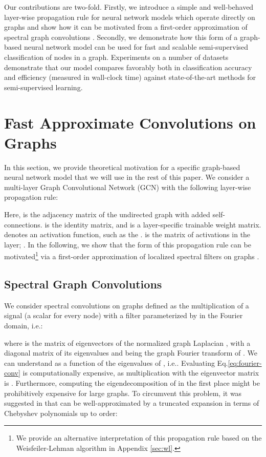 \documentclass{article} \usepackage{iclr2017_conference,times}
\makeatletter
\newcommand*{\ie}{i.e.\@\xspace}
\newcommand*{\eq}{Eq.\@\xspace}
\makeatother
\begin{document}
Our contributions are two-fold. Firstly, we introduce a simple and well-behaved layer-wise propagation rule for neural network models which operate directly on graphs and show how it can be motivated from a first-order approximation of spectral graph convolutions \citep{hammond2011wavelets}. Secondly, we demonstrate how this form of a graph-based neural network model can be used for fast and scalable semi-supervised classification of nodes in a graph. Experiments on a number of datasets demonstrate that our model compares favorably both in classification accuracy and efficiency (measured in wall-clock time) against state-of-the-art methods for semi-supervised learning.

\section{Fast Approximate Convolutions on Graphs}
\label{sec:fast-convs}

In this section, we provide theoretical motivation for a specific graph-based neural network model  that we will use in the rest of this paper. We consider a multi-layer Graph Convolutional Network (GCN) with the following layer-wise propagation rule:

Here,  is the adjacency matrix of the undirected graph  with added self-connections.   is the identity matrix,  and  is a layer-specific trainable weight matrix.  denotes an activation function, such as the .  is the matrix of activations in the  layer; . In the following, we show that the form of this propagation rule can be motivated\footnote{We provide an alternative interpretation of this propagation rule based on the Weisfeiler-Lehman algorithm \citep{weisfeiler1968reduction} in Appendix \ref{sec:wl}.} via a first-order approximation of localized spectral filters on graphs \citep{hammond2011wavelets, defferrard2016convolutional}.

\subsection{Spectral Graph Convolutions}
We consider spectral convolutions on graphs defined as the multiplication of a signal  (a scalar for every node) with a filter  parameterized by  in the Fourier domain, \ie:

where  is the matrix of eigenvectors of the normalized graph Laplacian , with a diagonal matrix of its eigenvalues  and  being the graph Fourier transform of . We can understand  as a function of the eigenvalues of , \ie . Evaluating \eq \ref{eq:fourier-conv} is computationally expensive, as multiplication with the eigenvector matrix  is . Furthermore, computing the eigendecomposition of  in the first place might be prohibitively expensive for large graphs. To circumvent this problem, it was suggested in \cite{hammond2011wavelets} that  can be well-approximated by a truncated expansion in terms of Chebyshev polynomials  up to  order:
\end{document}
